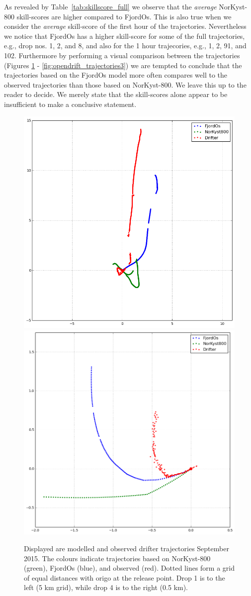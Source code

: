 As revealed by Table~\ref{tab:skillscore_full} we observe that the \emph{average} NorKyst-800 skill-scores are higher compared to FjordOs. This is also true when we consider the \emph{average} skill-score of the first hour of the trajectories. Nevertheless we notice that FjordOs has a higher skill-score for some of the full trajectories, e.g., drop nos. 1, 2, and 8, and also for the 1 hour trajecories, e.g., 1, 2, 91, and 102. Furthermore by performing a visual comparison between the trajectories (Figures \ref{fig:opendrift_trajectories1} - \ref{fig:opendrift_trajectories3}) we are tempted to conclude that the trajectories based on the FjordOs model more often compares well to the observed trajectories than those based on NorKyst-800. We leave this up to the reader to decide. We merely state that the skill-scores alone appear to be insufficient to make a conclusive statement.

\begin{figure}[htb]
	\centerline{
		\includegraphics*[width=.5\textwidth]{Figurer/opendrift/skillscore/drop1i0}
		\includegraphics*[width=.5\textwidth]{Figurer/opendrift/skillscore/drop4i7}
		}
	\caption{\small Displayed are modelled and observed drifter trajectories September 2015. The colours indicate trajectories based on NorKyst-800 (green), FjordOs (blue), and observed (red). Dotted lines form a grid of equal distances with origo at the release point. Drop 1 is to the left (5 km grid), while drop 4 is to the right (0.5 km).}
	\label{fig:opendrift_trajectories1}
\end{figure}

